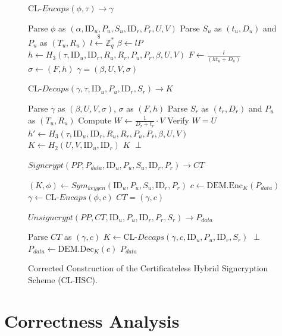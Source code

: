 \documentclass[10pt]{article}
\newenvironment{compactalgo}[1]{%
  \noindent\underline{#1}\par\smallskip
  \begin{algorithmic}[0]
}{%
  \end{algorithmic}%
  \par\smallskip
}
\begin{document}
\begin{figure}
{\begin{minipage}{\textwidth}
\begin{minipage}[t]{0.5\textwidth}
\begin{compactalgo}{$\text{CL-}Encaps(\phi,\tau) \rightarrow \gamma$}
\STATE Parse $\phi$ as $(\alpha, \text{ID}_u, P_u, S_u, \text{ID}_r, P_r, U, V)$
\STATE Parse $S_u$ as $(t_u, D_u)$ and $P_u$ as $(T_u, R_u)$
\STATE $l \stackrel{\$}{\leftarrow} \mathbb{Z}^*_q$
\STATE $\beta \leftarrow lP$
\STATE $h \leftarrow H_3(\tau, {\text{ID}}_u, {\text{ID}}_r, R_u, R_r, P_u, P_r, \beta, U, V)$
\STATE $F \leftarrow \frac{l}{(ht_u+D_u)}$
\STATE $\sigma \leftarrow (F, h)$
\RETURN $\gamma = (\beta, U, V, \sigma)$
\end{compactalgo}

\begin{compactalgo}{$\text{CL-}Decaps(\gamma, \tau, \text{ID}_u, P_u, \text{ID}_r, S_r) \rightarrow K$}
\STATE Parse $\gamma$ as $(\beta, U, V, \sigma)$, $\sigma$ as $(F, h)$
\STATE Parse $S_r$ as $(t_r, D_r)$ and $P_u$ as $(T_u, R_u)$
\STATE Compute $W \leftarrow \frac{1}{D_r + t_r} \cdot V$
\STATE Verify $W = U$ 
\STATE $h' \leftarrow H_3(\tau, \text{ID}_u, \text{ID}_r, R_u, R_r, P_u, P_r, \beta, U, V)$
    \STATE $K \leftarrow H_2(U,V,\text{ID}_u, \text{ID}_r)$
    \RETURN $K$
\ELSE
    \RETURN $\perp$
\ENDIF
\end{compactalgo}

\begin{compactalgo}{$Signcrypt(PP, P_{data}, \text{ID}_u, P_u, S_u, \text{ID}_r, P_r) \rightarrow CT$}
\STATE $(K, \phi) \leftarrow Sym_{keygen}(\text{ID}_u, P_u, S_u, \text{ID}_r, P_r)$
\STATE $c \leftarrow \text{DEM.Enc}_K(P_{data})$
\STATE $\gamma \leftarrow \text{CL-}Encaps(\phi, c)$
\RETURN $CT = (\gamma, c)$
\end{compactalgo}

\begin{compactalgo}{$Unsigncrypt(PP, CT, \text{ID}_u, P_u, \text{ID}_r, P_r, S_r) \rightarrow P_{data}$}
\STATE Parse $CT$ as $(\gamma, c)$
\STATE $K \leftarrow \text{CL-}Decaps(\gamma, c, \text{ID}_u, P_u, \text{ID}_r, S_r)$
    \RETURN $\perp$
\ELSE
    \STATE $P_{data} \leftarrow \text{DEM.Dec}_K(c)$
    \RETURN $P_{data}$
\ENDIF
\end{compactalgo}
\end{minipage}
\end{minipage}
}
\caption{Corrected Construction of the Certificateless Hybrid Signcryption Scheme (CL-HSC).}
\label{fig:scheme}
\end{figure}

\section{Correctness Analysis}
\end{document}
